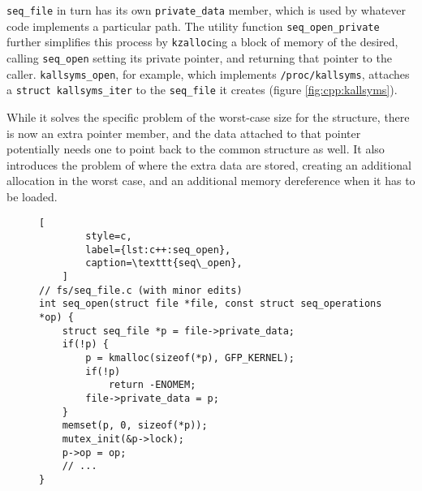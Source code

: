 \texttt{seq\_file} in turn has its own \texttt{private\_data} member, which is
used by whatever code implements a particular path.  The utility function
\texttt{seq\_open\_private} further simplifies this process by
\texttt{kzalloc}ing a block of memory of the desired, calling \texttt{seq\_open}
setting its private pointer, and returning that pointer to the caller.
\texttt{kallsyms\_open}, for example, which implements \texttt{/proc/kallsyms},
attaches a \texttt{struct kallsyms\_iter} to the \texttt{seq\_file} it creates
(figure \ref{fig:cpp:kallsyms}).

While it solves the specific problem of the worst-case size for the structure,
there is now an extra pointer member, and the data attached to that pointer
potentially needs one to point back to the common structure as well.  It also
introduces the problem of where the extra data are stored, creating an
additional allocation in the worst case, and an additional memory dereference
when it has to be loaded.

\begin{figure}[p]
    \begin{lstlisting}[
        style=c,
        label={lst:c++:seq_open},
        caption=\texttt{seq\_open},
    ]
// fs/seq_file.c (with minor edits)
int seq_open(struct file *file, const struct seq_operations *op) {
    struct seq_file *p = file->private_data;
    if(!p) {
        p = kmalloc(sizeof(*p), GFP_KERNEL);
        if(!p)
            return -ENOMEM;
        file->private_data = p;
    }
    memset(p, 0, sizeof(*p));
    mutex_init(&p->lock);
    p->op = op;
    // ...
}
    \end{lstlisting}
\end{figure}

